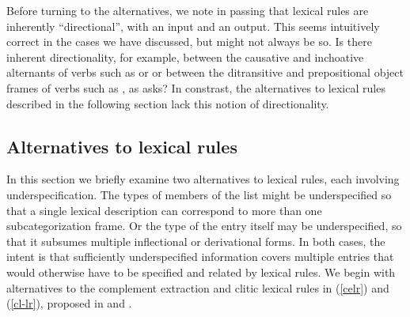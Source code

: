 \documentclass[output=paper]{langsci/langscibook}
\begin{document}
Before turning to the alternatives, we note in passing that lexical rules are inherently ``directional'', with an input and an output.
This seems intuitively correct in the cases we have discussed, but might not always be so.
Is there inherent directionality, for example, between the causative and inchoative alternants of verbs such as  or  or between the ditransitive and prepositional object frames of verbs such as , as \citet{Goldberg1995} asks?
In constrast, the alternatives to lexical rules described in the following section lack this notion of directionality.

\subsection{Alternatives to lexical rules}
\label{sec:alt}

In this section we briefly examine two alternatives to lexical rules, each involving underspecification. The types of members of the  list might be underspecified so that a single lexical description can correspond to more than one subcategorization frame. Or the type of the entry itself may be underspecified, so that it subsumes multiple inflectional or derivational forms. In both cases, the intent is that sufficiently underspecified information covers multiple entries that would otherwise have to be specified and related by lexical rules. We begin with alternatives to the complement extraction and clitic lexical rules in (\ref{celr}) and (\ref{cl-lr}), proposed in  and . 
 
\end{document}
